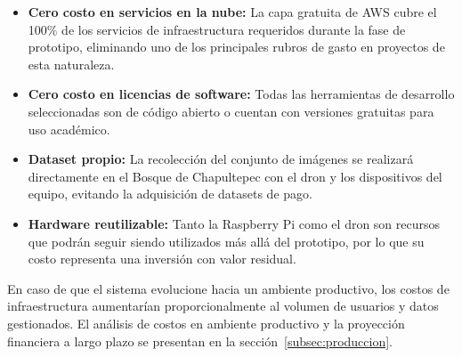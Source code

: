 \begin{itemize}
    \item \textbf{Cero costo en servicios en la nube:} La capa gratuita
    de AWS cubre el 100\% de los servicios de infraestructura requeridos
    durante la fase de prototipo, eliminando uno de los principales
    rubros de gasto en proyectos de esta naturaleza.
    \item \textbf{Cero costo en licencias de software:} Todas las
    herramientas de desarrollo seleccionadas son de código abierto o
    cuentan con versiones gratuitas para uso académico.
    \item \textbf{Dataset propio:} La recolección del conjunto de
    imágenes se realizará directamente en el Bosque de Chapultepec
    con el dron y los dispositivos del equipo, evitando la adquisición
    de datasets de pago.
    \item \textbf{Hardware reutilizable:} Tanto la Raspberry Pi como
    el dron son recursos que podrán seguir siendo utilizados más allá
    del prototipo, por lo que su costo representa una inversión con
    valor residual.
\end{itemize}

En caso de que el sistema evolucione hacia un ambiente productivo,
los costos de infraestructura aumentarían proporcionalmente al volumen
de usuarios y datos gestionados. El análisis de costos en ambiente
productivo y la proyección financiera a largo plazo se presentan en
la sección~\ref{subsec:produccion}.